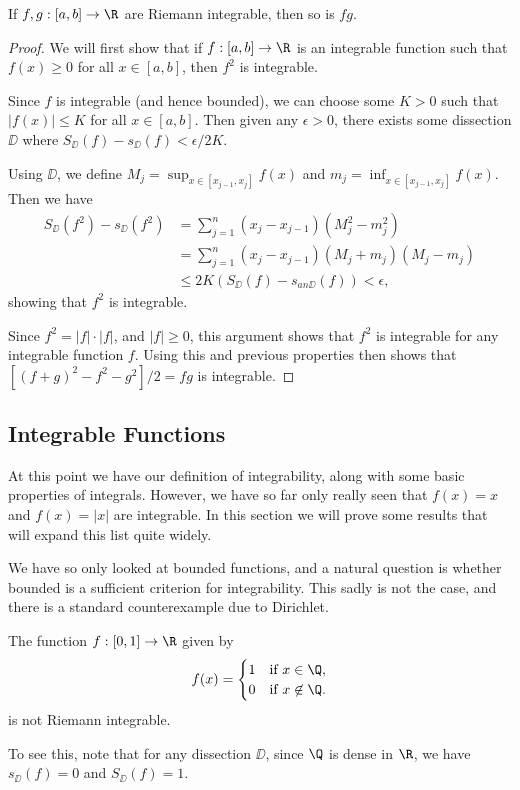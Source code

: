 \begin{proposition}
	If $f, g : [a, b] \rightarrow \R$ are Riemann integrable, then so is $fg$.
\end{proposition}
\begin{proof}
	We will first show that if $f: [a, b ]\rightarrow \R$ is an integrable function such that $f(x) \geq 0$ for all $x \in [a, b]$, then $f^2$ is integrable. 
	
	Since $f$ is integrable (and hence bounded), we can choose some  $K > 0$ such that $|f(x)| \leq K$ for all $x \in [a, b]$. Then given any $\epsilon> 0$, there exists some dissection $\DD$ where $S_{\DD}(f) - s_{\DD}(f) < \epsilon/2K$.

	Using $\DD$, we define $M_j = \sup_{x \in [x_{j - 1}, x_j]} f(x)$ and $m_j = \inf_{x \in [x_{j - 1}, x_j]} f(x)$. Then we have
	\begin{align*}
		S_\DD(f^2) - s_{\DD}(f^2) &= \sum_{j = 1}^{n} (x_{j} - x_{j - 1}) (M_j^2 - m_j^2) \\
		&= \sum_{j = 1}^{n} (x_{j} - x_{j - 1}) (M_j + m_j) (M_j - m_j)  \\
		&\leq  2K (S_\DD(f) - s_{an\DD}(f)) < \epsilon,
	\end{align*}
	showing that $f^2$ is integrable.

	Since $f^2 = |f| \cdot |f|$, and $|f| \geq 0$, this argument shows that $f^2$ is integrable for any integrable function $f$.
	Using this and previous properties then shows that $[(f + g)^2 - f^2 - g^2]/2 = fg$ is integrable.
\end{proof}

\subsection{Integrable Functions}

At this point we have our definition of integrability, along with some basic properties of integrals. However, we have so far only really seen that $f(x) = x$ and $f(x) = |x|$ are integrable. In this section we will prove some results that will expand this list quite widely.

We have so only looked at bounded functions, and a natural question is whether bounded is a sufficient criterion for integrability.
This sadly is not the case, and there is a standard counterexample due to Dirichlet.

\begin{example}
The function $f:[0, 1] \rightarrow \R$ given by
$$
f(x) = \begin{cases}
	1 &\mbox{if } x \in \Q, \\
	0 &\mbox{if } x \not\in \Q.
	\end{cases}
$$
is not Riemann integrable.

To see this, note that for any dissection $\DD$, since $\Q$ is dense in $\R$, we have $s_{\DD}(f) = 0$ and $S_{\DD}(f) = 1$.
 \end{example}

